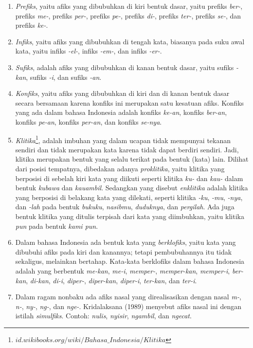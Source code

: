 \begin{enumerate}
	\item \textit{Prefiks}, yaitu afiks yang dibubuhkan di kiri bentuk dasar, yaitu prefiks \textit{ber-}, prefiks \textit{me-}, prefiks \textit{per-}, prefiks \textit{pe-}, prefiks \textit{di-}, prefiks \textit{ter-}, prefiks \textit{se-}, dan prefiks \textit{ke-}.
	
	\item \textit{Infiks}, yaitu afiks yang dibubuhkan di tengah kata, biasanya pada suku awal kata, yaitu infiks \textit{-el-}, infiks \textit{-em-}, dan infiks \textit{-er-}.
	
	\item \textit{Sufiks}, adalah afiks yang dibubuhkan di kanan bentuk dasar, yaitu sufiks \textit{-kan}, sufiks \textit{-i}, dan sufiks \textit{-an}.
	
	\item \textit{Konfiks}, yaitu afiks yang dibubuhkan di kiri dan di kanan bentuk dasar secara bersamaan karena konfiks ini merupakan satu kesatuan afiks. Konfiks yang ada dalam bahasa Indonesia adalah konfiks \textit{ke-an}, konfiks \textit{ber-an}, konfiks \textit{pe-an}, konfiks \textit{per-an}, dan konfiks \textit{se-nya}.
	
	\item \textit{Klitika}\footnote{$id.wikibooks.org/wiki/Bahasa\_Indonesia/Klitika$}, adalah imbuhan yang dalam ucapan tidak mempunyai tekanan sendiri dan tidak merupakan kata karena tidak dapat berdiri sendiri. Jadi, klitika merupakan bentuk yang selalu terikat pada bentuk (kata) lain. Dilihat dari posisi tempatnya, dibedakan adanya \textit{proklitika}, yaitu klitika yang berposisi di sebelah kiri kata yang diikuti seperti klitika \textit{ku-} dan \textit{kau-} dalam bentuk \textit{kubawa} dan \textit{kauambil}. Sedangkan yang disebut \textit{enklitika} adalah klitika yang berposisi di belakang kata yang dilekati, seperti klitika \textit{-ku}, \textit{-mu}, \textit{-nya}, dan \textit{-lah} pada bentuk \textit{bukuku}, \textit{nasibmu}, \textit{duduknya}, dan \textit{pergilah}. Ada juga bentuk klitika yang ditulis terpisah dari kata yang diimbuhkan, yaitu klitika \textit{pun} pada bentuk \textit{kami pun}.
	
	\item Dalam bahasa Indonesia ada bentuk kata yang \textit{berklofiks}, yaitu kata yang dibubuhi afiks pada kiri dan kanannya; tetapi pembubuhannya itu tidak sekaligus, melainkan bertahap. Kata-kata berklofiks dalam bahasa Indonesia adalah yang berbentuk \textit{me-kan}, \textit{me-i}, \textit{memper-}, \textit{memper-kan}, \textit{memper-i}, \textit{ber-kan}, \textit{di-kan}, \textit{di-i}, \textit{diper-}, \textit{diper-kan}, \textit{diper-i}, \textit{ter-kan}, dan \textit{ter-i}.
	
	\item Dalam ragam nonbaku ada afiks nasal yang direalisasikan dengan nasal \textit{m-}, \textit{n-}, \textit{ny-}, \textit{ng-}, dan \textit{nge-}. Kridalaksana (1989) menyebut afiks nasal ini dengan istilah \textit{simulfiks}. Contoh: \textit{nulis}, \textit{nyisir}, \textit{ngambil}, dan \textit{ngecat}.
\end{enumerate}


